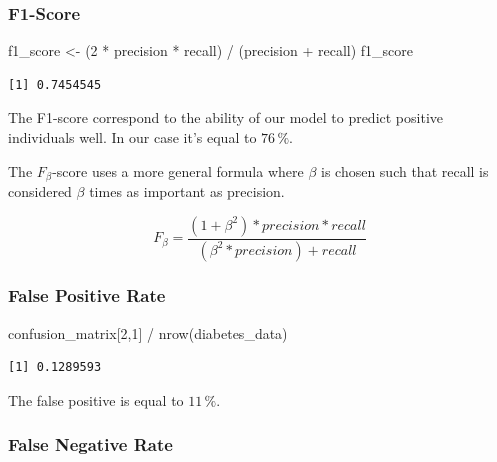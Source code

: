 \documentclass[
]{article}
\newenvironment{Shaded}{\begin{snugshade}}{\end{snugshade}}
\newcommand{\DecValTok}[1]{\textcolor[rgb]{0.00,0.00,0.81}{#1}}
\newcommand{\FunctionTok}[1]{\textcolor[rgb]{0.00,0.00,0.00}{#1}}
\newcommand{\NormalTok}[1]{#1}
\newcommand{\OtherTok}[1]{\textcolor[rgb]{0.56,0.35,0.01}{#1}}
\newcommand{\SpecialCharTok}[1]{\textcolor[rgb]{0.00,0.00,0.00}{#1}}
\begin{document}
\hypertarget{f1-score}{%
\subsubsection{F1-Score}\label{f1-score}}

\begin{Shaded}
\begin{Highlighting}[]
\NormalTok{f1\_score }\OtherTok{\textless{}{-}}\NormalTok{ (}\DecValTok{2} \SpecialCharTok{*}\NormalTok{ precision }\SpecialCharTok{*}\NormalTok{ recall) }\SpecialCharTok{/}\NormalTok{ (precision }\SpecialCharTok{+}\NormalTok{ recall)}
\NormalTok{f1\_score}
\end{Highlighting}
\end{Shaded}

\begin{verbatim}
[1] 0.7454545
\end{verbatim}

The F1-score correspond to the ability of our model to predict positive
individuals well. In our case it's equal to \(76\,\%\).

The \(F_\beta\)-score uses a more general formula where \(\beta\) is
chosen such that recall is considered \(\beta\) times as important as
precision.

\[F_\beta = \frac{(1 + \beta^2) * precision * recall}{(\beta^2 * precision) + recall}\]

\hypertarget{false-positive-rate}{%
\subsubsection{False Positive Rate}\label{false-positive-rate}}

\begin{Shaded}
\begin{Highlighting}[]
\NormalTok{confusion\_matrix[}\DecValTok{2}\NormalTok{,}\DecValTok{1}\NormalTok{] }\SpecialCharTok{/} \FunctionTok{nrow}\NormalTok{(diabetes\_data)}
\end{Highlighting}
\end{Shaded}

\begin{verbatim}
[1] 0.1289593
\end{verbatim}

The false positive is equal to \(11\,\%\).

\hypertarget{false-negative-rate}{%
\subsubsection{False Negative Rate}\label{false-negative-rate}}
\end{document}
